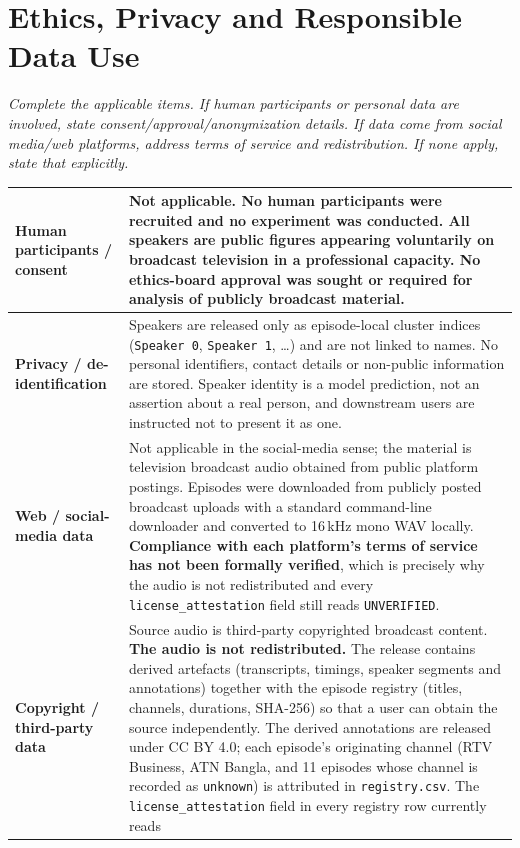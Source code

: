 \documentclass[11pt,a4paper]{article}
\newcommand{\thd}[1]{\textbf{\sffamily\small #1}}          %
\begin{document}
\section{Ethics, Privacy and Responsible Data Use}

\emph{\small Complete the applicable items. If human participants or personal data are involved,
state consent/approval/anonymization details. If data come from social media/web platforms,
address terms of service and redistribution. If none apply, state that explicitly.}

\begin{longtable}{|L{4.4cm}|L{11.0cm}|}
\hline
\thd{Human participants / consent} & Not applicable. No human participants were recruited and no
experiment was conducted. All speakers are public figures appearing voluntarily on broadcast
television in a professional capacity. No ethics-board approval was sought or required for
analysis of publicly broadcast material. \\ \hline
\thd{Privacy / de-identification} & Speakers are released only as episode-local cluster indices
(\texttt{Speaker 0}, \texttt{Speaker 1}, \dots) and are not linked to names. No personal
identifiers, contact details or non-public information are stored. Speaker identity is a model
prediction, not an assertion about a real person, and downstream users are instructed not to
present it as one. \\ \hline
\thd{Web / social-media data} & Not applicable in the social-media sense; the material is
television broadcast audio obtained from public platform postings. Episodes were downloaded from publicly posted broadcast uploads with a standard command-line downloader and converted to 16\,kHz mono WAV locally. \textbf{Compliance with each platform's terms of service has not been formally verified}, which is precisely why the audio is not redistributed and every \texttt{license\_attestation} field still reads \texttt{UNVERIFIED}. \\ \hline
\thd{Copyright / third-party data} & Source audio is third-party copyrighted broadcast content.
\textbf{The audio is not redistributed.} The release contains derived artefacts (transcripts,
timings, speaker segments and annotations) together with the episode registry (titles,
channels, durations, SHA-256) so that a user can obtain the source independently.
The derived annotations are released under CC BY 4.0; each episode's originating channel (RTV Business, ATN Bangla, and 11 episodes whose channel is recorded as \texttt{unknown}) is attributed in \texttt{registry.csv}. The \texttt{license\_attestation} field in every registry row currently reads

\end{longtable}
\end{document}
